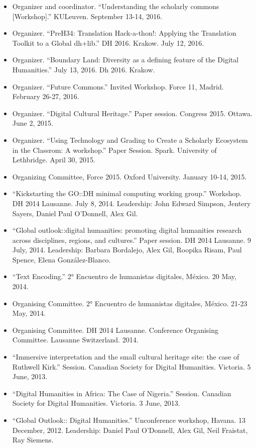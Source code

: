 \documentclass[12pt]{article}
\begin{document}
\begin{itemize}
  \item Organizer and coordinator. “Understanding the scholarly commons [Workshop].” KULeuven. September 13-14, 2016.
  \item Organizer. “PreH34: Translation Hack-a-thon!: Applying the Translation Toolkit to a Global dh+lib.” DH 2016. Krakow. July 12, 2016.
  \item Organizer. “Boundary Land: Diversity as a defining feature of the Digital Humanities.” July 13, 2016. Dh 2016. Krakow.
  \item Organizer. “Future Commons.” Invited Workshop. Force 11, Madrid. February 26-27, 2016.
  \item Organizer. “Digital Cultural Heritage.” Paper session. Congress 2015. Ottawa. June 2, 2015.
  \item Organizer. “Using Technology and Grading to Create a Scholarly Ecosystem in the Classrom: A workshop.” Paper Session. Spark. University of Lethbridge. April 30, 2015.
  \item Organizing Committee, Force 2015. Oxford University. January 10-14, 2015.
  \item “Kickstarting the GO::DH minimal computing working group.” Workshop. DH 2014 Lausanne. July 8, 2014. Leadership: John Edward Simpson, Jentery Sayers, Daniel Paul O'Donnell, Alex Gil.
  \item “Global outlook::digital humanities: promoting digital humanities research across disciplines, regions, and cultures.” Paper session. DH 2014 Lausanne. 9 July, 2014. Leadership: Barbara Bordalejo, Alex Gil, Roopika Risam, Paul Spence, Elena González-Blanco.
  \item “Text Encoding.” 2° Encuentro de humanistas digitales, México. 20 May, 2014.
  \item Organising Committee. 2° Encuentro de humanistas digitales, México. 21-23 May, 2014.
  \item Organising Committee. DH 2014 Lausanne. Conference Organising Committee. Lausanne Switzerland. 2014.
  \item “Immersive interpretation and the small cultural heritage site: the case of Ruthwell Kirk.” Session. Canadian Society for Digital Humanities. Victoria. 5 June, 2013.
  \item “Digital Humanities in Africa: The Case of Nigeria.” Session. Canadian Society for Digital Humanities. Victoria. 3 June, 2013.
  \item “Global Outlook:: Digital Humanities.” Unconference workshop, Havana. 13 December, 2012. Leadership: Daniel Paul O'Donnell, Alex Gil, Neil Fraistat, Ray Siemens.

\end{itemize}
\end{document}
